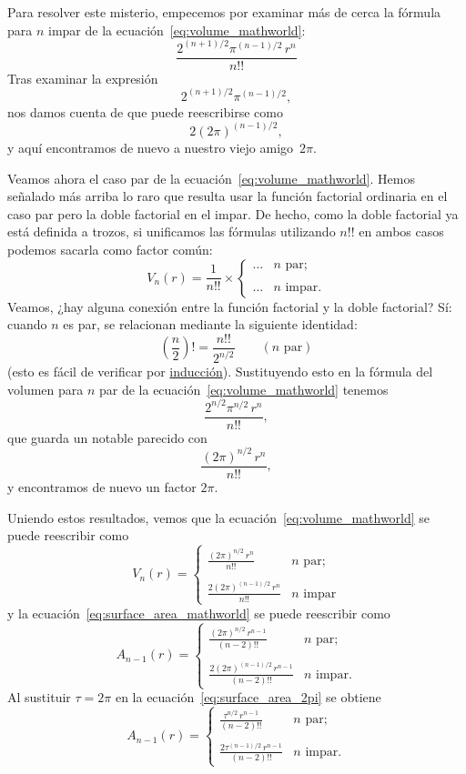 Para resolver este misterio, empecemos por examinar más de cerca la fórmula para $n$ impar de la ecuación~\eqref{eq:volume_mathworld}:
\[ \frac{2^{(n+1)/2}\pi^{(n-1)/2}\,r^n}{n!!} \]
Tras examinar la expresión
\[ 2^{(n+1)/2}\pi^{(n-1)/2}, \]
nos damos cuenta de que puede reescribirse como
\[ 2(2\pi)^{(n-1)/2}, \]
y aquí encontramos de nuevo a nuestro viejo amigo~$2\pi$.

Veamos ahora el caso par de la ecuación~\eqref{eq:volume_mathworld}. Hemos señalado más arriba lo raro que resulta usar la función factorial ordinaria en el caso par pero la doble factorial en el impar. De hecho, como la doble factorial ya está definida a trozos, si unificamos las fórmulas utilizando $n!!$ en ambos casos podemos sacarla como factor común:
\[
V_n(r) = \frac{1}{n!!}\times \begin{cases}
\ldots & n \text{ par}; \\ \\
 \ldots & n \text{ impar}.
 \end{cases}
\]
Veamos, ¿hay alguna conexión entre la función factorial y la doble factorial? Sí: cuando $n$ es par, se relacionan mediante la siguiente identidad:
\[ \left(\frac{n}{2}\right)! = \frac{n!!}{2^{n/2}}  \qquad (\text{$n$ par}) \]
(esto es fácil de verificar por \href{https://es.wikipedia.org/wiki/Inducción_matemática}{inducción}). Sustituyendo esto en la fórmula del volumen para $n$ par de la ecuación~\eqref{eq:volume_mathworld} tenemos
\[ \frac{2^{n/2}\pi^{n/2}\,r^n}{n!!}, \]
que guarda un notable parecido con
\[ \frac{(2\pi)^{n/2}\,r^n}{n!!}, \]
y encontramos de nuevo un factor $2\pi$.

Uniendo estos resultados, vemos que la ecuación~\eqref{eq:volume_mathworld} se puede reescribir como
\begin{equation}
\label{eq:volume_2pi}
V_n(r) = \begin{cases}
 \displaystyle \frac{(2\pi)^{n/2}\,r^n}{n!!} & n \text{ par}; \\ \\
 \displaystyle \frac{2(2\pi)^{(n-1)/2}\,r^n}{n!!} & n \text{ impar}
 \end{cases}
\end{equation}
y la ecuación~\eqref{eq:surface_area_mathworld} se puede reescribir como
\begin{equation}
\label{eq:surface_area_2pi}
A_{n-1}(r) = \begin{cases}
\displaystyle \frac{(2\pi)^{n/2}\,r^{n-1}}{(n-2)!!} & n \text{ par}; \\ \\
\displaystyle \frac{2(2\pi)^{(n-1)/2}\,r^{n-1}}{(n-2)!!} & n \text{ impar}.
\end{cases}
\end{equation}
Al sustituir $\tau=2\pi$ en la ecuación~\eqref{eq:surface_area_2pi} se obtiene
\[
A_{n-1}(r) = \begin{cases}
\displaystyle \frac{\tau^{n/2}\,r^{n-1}}{(n-2)!!} & n \text{ par}; \\ \\
\displaystyle \frac{2\tau^{(n-1)/2}\,r^{n-1}}{(n-2)!!} & n \text{ impar}.
\end{cases} \]

